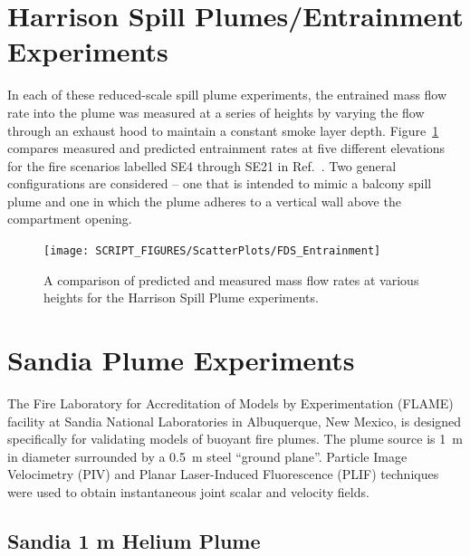 \clearpage

\section{Harrison Spill Plumes/Entrainment Experiments}
\label{Harrison_Spill_Plumes}
\label{Entrainment}

In each of these reduced-scale spill plume experiments, the entrained mass flow rate into the plume was measured at a series of heights by varying the flow through an exhaust hood to maintain a constant smoke layer depth.  Figure~\ref{Entrainment_Plot} compares measured and predicted entrainment rates at five different elevations for the fire scenarios labelled SE4 through SE21 in Ref.~\cite{Harrison:2009}. Two general configurations are considered -- one that is intended to mimic a balcony spill plume and one in which the plume adheres to a vertical wall above the compartment opening.

\begin{figure}[h]
\begin{center}
\texttt{[image: SCRIPT\_FIGURES/ScatterPlots/FDS\_Entrainment]}
\caption[Summary of plume entrainment predictions]{A comparison of predicted and measured mass flow rates at various heights for the Harrison Spill Plume experiments.}
\label{Entrainment_Plot}
\end{center}
\end{figure}




\clearpage

\section{Sandia Plume Experiments}

The Fire Laboratory for Accreditation of Models by Experimentation (FLAME) facility \cite{OHern:2005,Blanchat:2001} at Sandia National Laboratories in Albuquerque, New Mexico, is designed specifically for validating models of buoyant fire plumes.  The plume source is 1~m in diameter surrounded by a 0.5~m steel ``ground plane''. Particle Image Velocimetry (PIV) and Planar Laser-Induced Fluorescence (PLIF) techniques were used to obtain instantaneous joint scalar and velocity fields.

\subsection{Sandia 1 m Helium Plume}
\label{Sandia plume}

